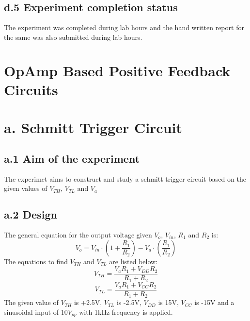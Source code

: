 \documentclass[12pt]{article}
\begin{document}
\subsection*{d.5 Experiment completion status}
The experiment was completed during lab hours and the hand written report for the same was also submitted during lab hours.

\newpage
\section{OpAmp Based Positive Feedback Circuits}
\section*{a. Schmitt Trigger Circuit}
\subsection*{a.1 Aim of the experiment}
The experimet aims to construct and study a schmitt trigger circuit based on the given values of $V_{TH}$, $V_{TL}$ and $V_{a}$\\
\subsection*{a.2 Design}
The general equation for the output voltage given $V_{o}$, $V_{in}$, $R_{1}$ and $R_{2}$ is:
 \begin{equation}
     V_{o} = V_{in} \cdot (1 + \frac{R_{1}}{R_{2}}) - V_{a}\cdot(\frac{R_{1}}{R_{2}})
 \end{equation}  
The equations to find $V_{TH}$ and $V_{TL}$ are listed below:
 \begin{equation}
     V_{TH} = \frac{V_{a} R_{1} + V_{DD} R_{2}}{R_{1} + R_{2}}
 \end{equation}   
 \begin{equation}
     V_{TL} = \frac{V_{a} R_{1} + V_{CC} R_{2}}{R_{1} + R_{2}}
 \end{equation}   
 The given value of $V_{TH}$ is +2.5V, $V_{TL}$ is -2.5V, $V_{DD}$ is 15V, $V_{CC}$ is -15V and a sinusoidal input of 10$V_{pp}$ with 1kHz frequency is applied.
  
\end{document}
